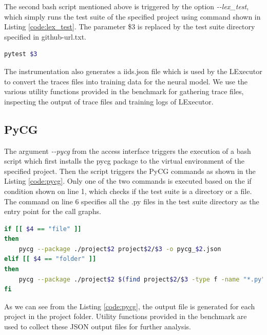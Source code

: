 The second bash script mentioned above is triggered by the option \textit{\--\--lex\_test}, which simply runs the test suite of the specified project using command shown in Listing \ref{code:lex_test}.
The parameter \$3 is replaced by the test suite directory specified in github-url.txt.
\begin{lstlisting}[caption=LExecutor Test Suite Execution.,label=code:lex_test,language=Bash]
pytest $3
\end{lstlisting}

The instrumentation also generates a iids.json file which is used by the LExecutor to convert the traces files into training data for the neural model.
We use the various utility functions provided in the benchmark for gathering trace files, inspecting the output of trace files and training logs of LExecutor.

\subsection{PyCG}
The argument \textit{\--\--pycg} from the access interface triggers the execution of a bash script which first installs the pycg package to the virtual environment of the specified project.
Then the script triggers the PyCG commands as shown in the Listing \ref{code:pycg}.
Only one of the two commands is executed based on the if condition shown on line 1, which checks if the test suite is a directory or a file.
The command on line 6 specifies all the .py files in the test suite directory as the entry point for the call graphs.
\begin{lstlisting}[caption=PyCG Execution.,label=code:pycg,language=Bash]
if [[ $4 == "file" ]]
then
    pycg --package ./project$2 project$2/$3 -o pycg_$2.json
elif [[ $4 == "folder" ]]
then
    pycg --package ./project$2 $(find project$2/$3 -type f -name "*.py") -o pycg_$2.json
fi
\end{lstlisting}

As we can see from the Listing \ref{code:pycg}, the output file is generated for each project in the project folder.
Utility functions provided in the benchmark are used to collect these JSON output files for further analysis.  

